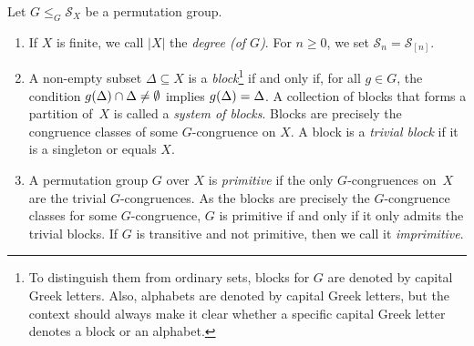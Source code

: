 
\label{def:S_X}


Let $G \le_G \mathcal S_X$ be a permutation group.

\begin{enumerate}
	\item If $X$ is finite, we call $|X|$ the \emph{degree (of $G$)}.
	For $n\ge 0$, we set $\mathcal S_n = \mathcal S_{[n]}$. \label{def:S_n} 
	
	\label{def:block-perm-grp}
	\item A non-empty subset $\Delta \subseteq X$ is a \emph{block}\footnote{To distinguish them from ordinary sets, blocks for $G$ 
		are denoted by capital Greek letters. Also, alphabets are denoted by capital
		Greek letters, but the context should always make it clear
		whether a specific capital Greek letter denotes a block or an alphabet.} if and only if, for all $g \in G$,
	the condition $g(\Delta) \cap \Delta \ne \emptyset$ implies $g(\Delta) = \Delta$.
	A collection of blocks that forms a partition of~$X$
	is called a \emph{system of blocks}. 
	Blocks are precisely the congruence classes of some $G$-congruence on $X$.
	A block is a \emph{trivial block} if it is a singleton or equals $X$.
	

\item A permutation group $G$ over $X$ is \emph{primitive} if the only
$G$-congruences on~$X$ are the trivial $G$-congruences.
As the blocks are precisely the $G$-congruence classes
for some $G$-congruence, 
$G$ is primitive if and only if it only admits
the trivial blocks.
If $G$ is transitive and not primitive, then we call it \emph{imprimitive}.
		

\end{enumerate}
